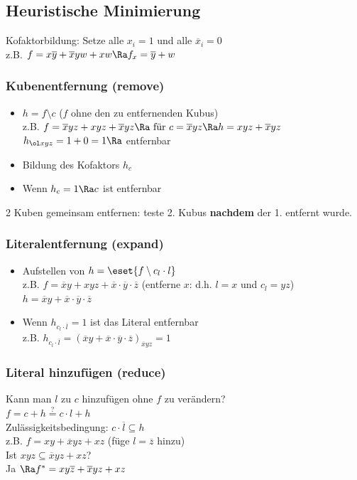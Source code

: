\documentclass[6pt,a4paper]{scrartcl}
\begin{document}
\begin{multicols}{3}
\subsection{Heuristische Minimierung}
Kofaktorbildung: Setze alle $x_i = 1$ und alle $\overline x_i = 0$ \\
z.B. $f = x\overline y + \overline x yw + x w \Ra f_x = \overline y + w$


\subsubsection{Kubenentfernung (remove)}
\begin{itemize}
	\item $h = f \setminus c$ ($f$ ohne den zu entfernenden Kubus) \\
	z.B. $ f = \overline x y z+ x y z + \overline x  yz \Ra \text{ für } c = \overline x y z \Ra h =  xyz + \overline x y z$ \\
	$h_{\ol xyz} = 1 + 0 = 1 \Ra$ entfernbar
	\item Bildung des Kofaktors $h_c$
	\item Wenn $h_c = 1 \Ra c$ ist entfernbar
\end{itemize}
2 Kuben gemeinsam entfernen: teste 2. Kubus \textbf{nachdem} der 1. entfernt wurde.
\subsubsection{Literalentfernung (expand)}

\begin{itemize}
	\item Aufstellen von $h = \eset{f \setminus c_l \cdot l}$ \\
	z.B. $ f = \overline x y + x y z + \overline x \cdot \overline y \cdot \overline z$ (entferne $x$: d.h. $l = x$ und $c_l = yz$) \\ 
	$h = \overline x y  + \overline x \cdot \overline y \cdot \overline z$
	\item Wenn $h_{c_l \cdot \overline l} = 1$ ist das Literal entfernbar \\
	z.B. $h_{c_l \cdot \overline l} = (\overline x y  + \overline x \cdot \overline y \cdot \overline z)_{\overline x y z} = 1$
\end{itemize}

\subsubsection{Literal hinzufügen (reduce)}
Kann man $l$ zu $c$ hinzufügen ohne $f$ zu verändern? \\
$f = c + h \overset{?}{=} c \cdot l + h$
\\ Zulässigkeitsbedingung: $c \cdot \overline l \subseteq h$ \\
z.B. $f = xy + \overline x y z + xz$ (füge $l = \overline z$ hinzu) \\
Ist $xyz \subseteq \overline x yz + xz$? \\
Ja $\Ra f^* = xy \overline z + \overline x yz + xz$


\end{multicols}
\end{document}
